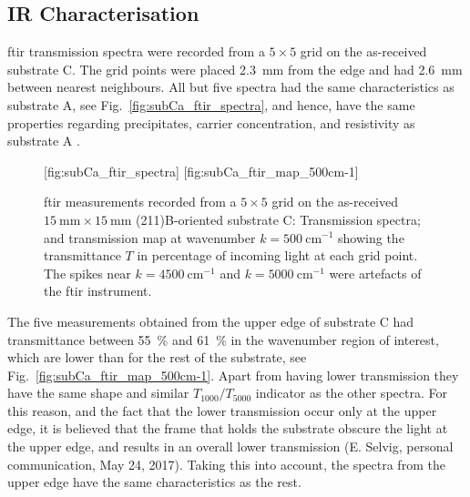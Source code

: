 \subsection{IR Characterisation}

\Ac{ftir} transmission spectra were recorded from a $5\times5$ grid on the as-received substrate C. The grid points were placed \SI{2.3}{\milli\metre} from the edge and had \SI{2.6}{\milli\metre} between nearest neighbours. All but five spectra had the same characteristics as substrate A, see Fig.~\ref{fig:subCa_ftir_spectra}, and hence, have the same properties regarding precipitates, carrier concentration, and resistivity as substrate A \citep{yujie2004infrared}.

\begin{figure}[htbp]
    \centering
    [fig:subCa_ftir_spectra]
    \hfill
    [fig:subCa_ftir_map_500cm-1]
    \caption[\Ac{ftir} measurements of the as-received substrate C.]{\Ac{ftir} measurements recorded from a $5\times5$ grid on the as-received $\SI{15}{\milli\metre}\times\SI{15}{\milli\metre}$ (211)B-oriented substrate C:  Transmission spectra; and  transmission map at wavenumber $k=\SI{500}{\centi\metre^{-1}}$ showing the transmittance $T$ in percentage of incoming light at each grid point. The spikes near $k=\SI{4500}{\centi\metre^{-1}}$ and $k=\SI{5000}{\centi\metre^{-1}}$ were artefacts of the \ac{ftir} instrument.}
\end{figure}

The five measurements obtained from the upper edge of substrate C had transmittance between \SI{55}{\percent} and \SI{61}{\percent} in the wavenumber region of interest, which are lower than for the rest of the substrate, see Fig.~\ref{fig:subCa_ftir_map_500cm-1}. Apart from having lower transmission they have the same shape and similar $T_{1000}/T_{5000}$ indicator as the other spectra. For this reason, and the fact that the lower transmission occur only at the upper edge, it is believed that the frame that holds the substrate obscure the light at the upper edge, and results in an overall lower transmission (E. Selvig, personal communication, May 24, 2017). Taking this into account, the spectra from the upper edge have the same characteristics as the rest.




